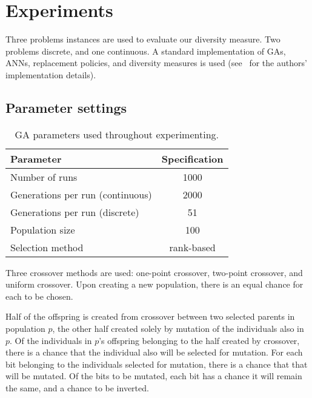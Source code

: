 \section{Experiments}
Three problems instances are used to evaluate our diversity measure. Two problems discrete, and one continuous. A standard implementation of GAs, ANNs, replacement policies, and diversity measures is used (see~\cite{mbm:kmc:ekoGA} for the authors' implementation details). 

\subsection{Parameter settings}

\begin{table}
  \centering
  \begin{tabular}{l S}
    \toprule
    Parameter & {Specification} \\
    \midrule
    Number of runs & 1000 \\
    Generations per run (continuous) & 2000 \\
    Generations per run (discrete) & 51 \\
    Population size & 100 \\
    Selection method & {rank-based} \\
    \bottomrule
  \end{tabular}
  \caption{GA parameters used throughout experimenting.}
  \label{tab:gaparam}
\end{table}

Three crossover methods are used: one-point crossover, two-point crossover, and uniform crossover. Upon creating a new population, there is an equal chance for each to be chosen.

Half of the offspring is created from crossover between two selected parents in population $p$, the other half created solely by mutation of the individuals also in $p$. Of the individuals in $p$'s offspring belonging to the half created by crossover, there is a  chance that the individual also will be selected for mutation. For each bit belonging to the individuals selected for mutation, there is a  chance that that will be mutated. Of the bits to be mutated, each bit has a  chance it will remain the same, and a  chance to be inverted.




